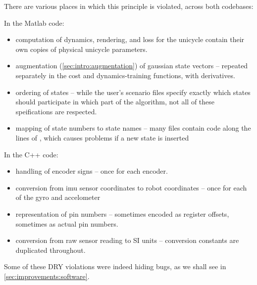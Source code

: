 \documentclass[main.tex]{subfiles}
\begin{document}
	There are various places in which this principle is violated, across both codebases:
	\begin{multicols}{2}
		\raggedcolumns
		\noindent
		In the Matlab code:

		\begin{itemize}[noitemsep]
			\item computation of dynamics, rendering, and loss for the unicycle contain their own copies of physical unicycle parameters.
			\item augmentation (\ref{sec:intro:augmentation}) of gaussian state vectors -- repeated separately in the cost and dynamics-training functions, with derivatives.
			\item ordering of states -- while the user's scenario files specify exactly which states should participate in which part of the algorithm, not all of these speifications are respected.
			\item mapping of state numbers to state names -- many files contain code along the lines of , which causes problems if a new state is inserted
		\end{itemize}

		\columnbreak

		\noindent
		In the C++ code:

		\begin{itemize}[noitemsep]
			\item handling of encoder signs -- once for each encoder.
			\item conversion from imu sensor coordinates to robot coordinates -- once for each of the gyro and accelometer
			\item representation of pin numbers -- sometimes encoded as register offsets, sometimes as actual pin numbers.
			\item conversion from raw sensor reading to SI units -- conversion constants are duplicated throughout.
		\end{itemize}
	\end{multicols}
	Some of these DRY violations were indeed hiding bugs, as we shall see in \cref{sec:improvements:software}.

\end{document}
